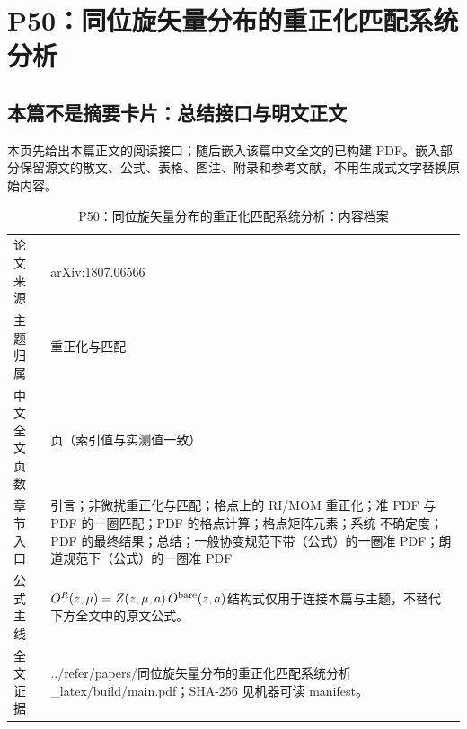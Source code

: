 \documentclass[UTF8,11pt,oneside]{ctexbook}
\begin{document}
\chapter{P50：同位旋矢量分布的重正化匹配系统分析}
\section*{本篇不是摘要卡片：总结接口与明文正文}
本页先给出本篇正文的阅读接口；随后嵌入该篇中文全文的已构建 PDF。嵌入部分保留源文的散文、公式、表格、图注、附录和参考文献，不用生成式文字替换原始内容。
\begin{table}[htbp]
  \centering
  \caption{P50：同位旋矢量分布的重正化匹配系统分析：内容档案}
  \small
  \begin{tabularx}{0.96\textwidth}{@{}p{3.3cm}>{\raggedright\arraybackslash}X@{}}
    \toprule
    论文来源 & arXiv:1807.06566 \\
    主题归属 & 重正化与匹配 \\
    中文全文页数 & 22 页（索引值与实测值一致） \\
    章节入口 & 引言；非微扰重正化与匹配；格点上的 RI/MOM 重正化；准 PDF 与 PDF 的一圈匹配；PDF 的格点计算；格点矩阵元素；系统 不确定度；PDF 的最终结果；总结；一般协变规范下带（公式）的一圈准 PDF；朗道规范下（公式）的一圈准 PDF \\
    公式主线 & $O^{R}(z,\mu)=Z(z,\mu,a)\,O^{\rm bare}(z,a)$\newline\scriptsize 结构式仅用于连接本篇与主题，不替代下方全文中的原文公式。 \\
    全文证据 & ../\allowbreak{}refer/\allowbreak{}papers/\allowbreak{}同位旋矢量分布的重正化匹配系统分析\_\allowbreak{}latex/\allowbreak{}build/\allowbreak{}main.pdf；SHA-256 见机器可读 manifest。 \\
    \bottomrule
  \end{tabularx}
\end{table}
\end{document}
